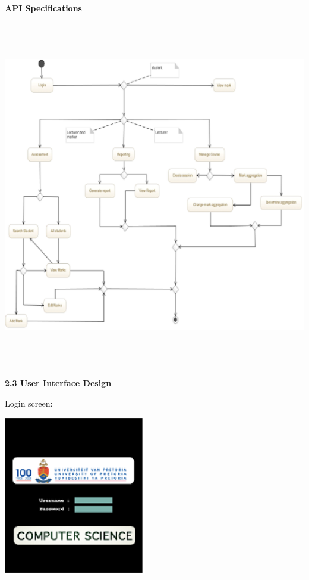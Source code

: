\documentclass{article}
\begin{document}
\noindent \textbf{API Specifications}

\noindent \textbf{}

\noindent \textbf{}

\noindent \includegraphics*[width=6.55in, height=6.01in, keepaspectratio=false]{image3}

























\noindent \textbf{2.3  User Interface Design}

Login screen:

\includegraphics*[width=2.46in, height=2.76in, keepaspectratio=false]{image4}
\end{document}
